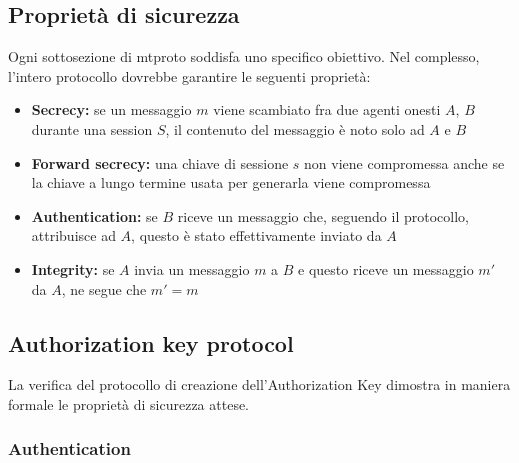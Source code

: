 \subsection{Proprietà di sicurezza}
Ogni sottosezione di \gls{mtproto} soddisfa uno specifico obiettivo.
Nel complesso, l'intero protocollo dovrebbe garantire le seguenti proprietà:
\begin{itemize}
    \item \textbf{Secrecy:} se un messaggio $m$ viene scambiato fra due agenti onesti $A$, $B$ durante una session $S$,
          il contenuto del messaggio è noto solo ad $A$ e $B$
    \item \textbf{Forward secrecy:} una chiave di sessione $s$ non viene compromessa
          anche se la chiave a lungo termine usata per generarla viene compromessa
    \item \textbf{Authentication:} se $B$ riceve un messaggio che, seguendo il protocollo,
          attribuisce ad $A$, questo è stato effettivamente inviato da $A$
    \item \textbf{Integrity:} se $A$ invia un messaggio $m$ a $B$
          e questo riceve un messaggio $m'$ da $A$, ne segue che $m' = m$
\end{itemize}

\subsection{Authorization key protocol}
La verifica del protocollo di creazione dell'Authorization Key dimostra in maniera formale le proprietà di sicurezza attese.

\subsubsection{Authentication}







